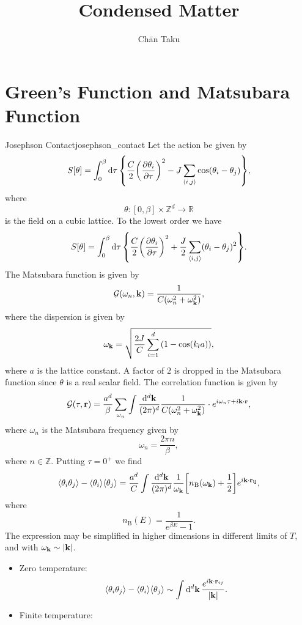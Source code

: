 \documentclass{article}
\title{Condensed Matter}
\author{Ch\=an Taku}
\begin{document}
\maketitle

\section{Green's Function and Matsubara Function}

\begin{example}{Josephson Contact}{josephson_contact}
    Let the action be given by
    \[ S[\theta] = \int_0^\beta \dd{\tau} \qty{ \frac{C}{2}\qty(\pdv{\theta_i}{\tau})^2 - J \sum_{\langle i,j \rangle} \cos(\theta_i - \theta_j) }, \]
    where
    \[ \theta: [0,\beta] \times \mathbb{Z}^d \rightarrow \mathbb{R} \]
    is the field on a cubic lattice. To the lowest order we have
    \[ S[\theta] = \int_0^\beta \dd{\tau} \qty{ \frac{C}{2}\qty(\pdv{\theta_i}{\tau})^2 + \frac{J}{2} \sum_{\langle i,j \rangle} (\theta_i - \theta_j)^2 }. \]
    The Matsubara function is given by
    \[ \mathcal{G}(\omega_n, \vb{k}) = \frac{1}{C(\omega_n^2 + \omega_{\vb{k}}^2)}, \]
    where the dispersion is given by
    \[ \omega_{\vb{k}} = \sqrt{\frac{2J}{C} \sum_{i=1}^d \qty(1 - \cos (k_l a))}, \]
    where $a$ is the lattice constant.
    A factor of $2$ is dropped in the Matsubara function since $\theta$ is a real scalar field.
    The correlation function is given by
    \[ \mathcal{G}(\tau, \vb{r}) = \frac{a^d}{\beta} \sum_{\omega_n} \int \frac{\dd{^d \vb{k}}}{(2\pi)^d} \frac{1}{C(\omega_n^2 + \omega_{\vb{k}}^2)} \cdot e^{i \omega_n \tau + i \vb{k} \cdot \vb{r}}, \]
    where $\omega_n$ is the Matsubara frequency given by
    \[ \omega_n = \frac{2\pi n}{\beta}, \]
    where $n\in \mathbb{Z}$.
    Putting $\tau = 0^+$ we find
    \[ \langle \theta_i \theta_j \rangle - \langle \theta_i \rangle \langle \theta_j \rangle = \frac{a^d}{C} \int \frac{\dd{^d \vb{k}}}{(2\pi)^d} \frac{1}{\omega_{\vb{k}}}\qty[n_{\mathrm{B}}(\omega_{\vb{k}}) + \frac{1}{2}] e^{i\vb{k}\cdot \vb{r_{ij}}}, \]
    where
    \[ n_{\mathrm{B}}(E) = \frac{1}{e^{\beta E} - 1}. \]
    The expression may be simplified in higher dimensions in different limits of $T$, and with $\omega_{\vb{k}} \sim \abs{\vb{k}}$.
    \begin{itemize}
        \item Zero temperature:
        \[ \langle \theta_i \theta_j \rangle - \langle \theta_i \rangle \langle \theta_j \rangle \sim \int \dd{^d \vb{k}} \frac{e^{i \vb{k}\cdot \vb{r}_{ij}}}{\abs{\vb{k}}}. \]
        \item Finite temperature:

\end{itemize}
\end{example}
\end{document}
